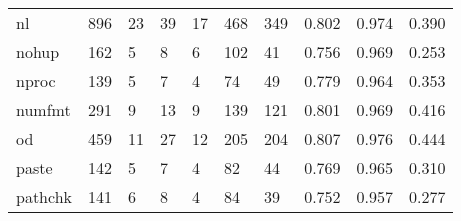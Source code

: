 \begin{longtable}{lp{1.3cm}p{1.3cm}p{1.3cm}p{1.3cm}p{1.3cm}p{1.3cm}p{1.3cm}p{1.3cm}p{1.3cm}}
nl        &                    896 &                                 23 &                                39 &                               17 &                               468 &                             349 &                                   0.802 &                                  0.974 &                                0.390 \\
nohup     &                    162 &                                  5 &                                 8 &                                6 &                               102 &                              41 &                                   0.756 &                                  0.969 &                                0.253 \\
nproc     &                    139 &                                  5 &                                 7 &                                4 &                                74 &                              49 &                                   0.779 &                                  0.964 &                                0.353 \\
numfmt    &                    291 &                                  9 &                                13 &                                9 &                               139 &                             121 &                                   0.801 &                                  0.969 &                                0.416 \\
od        &                    459 &                                 11 &                                27 &                               12 &                               205 &                             204 &                                   0.807 &                                  0.976 &                                0.444 \\
paste     &                    142 &                                  5 &                                 7 &                                4 &                                82 &                              44 &                                   0.769 &                                  0.965 &                                0.310 \\
pathchk   &                    141 &                                  6 &                                 8 &                                4 &                                84 &                              39 &                                   0.752 &                                  0.957 &                                0.277 \\

\end{longtable}

